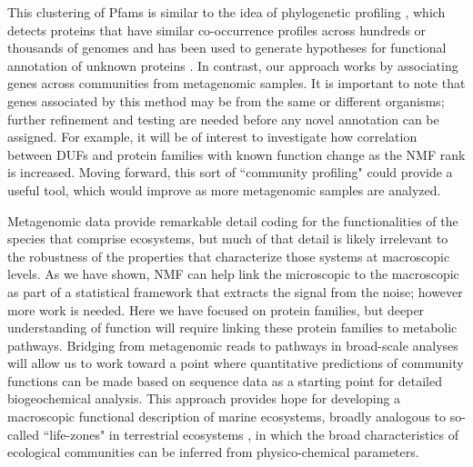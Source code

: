 This clustering of Pfams is similar to the idea of phylogenetic profiling \cite{PellMarc99}, which detects proteins that have similar co-occurrence profiles across hundreds or thousands of genomes and has been used to generate hypotheses for functional annotation of unknown proteins \cite{WuMRen05}. In contrast, our approach works by associating genes across communities from metagenomic samples. It is important to note that genes associated by this method may be from the same or different organisms; further refinement and testing are needed before any novel annotation can be assigned.  For example, it will be of interest to investigate how correlation between DUFs and protein families with known function change as the NMF rank is increased.  Moving forward, this sort of ``community profiling" could provide a useful tool, which would improve as more metagenomic samples are analyzed.


Metagenomic data provide remarkable detail coding for the functionalities of the species that comprise ecosystems, but much of that detail is likely irrelevant to the robustness of the properties that characterize those systems at macroscopic levels.   As we have shown, NMF can help link the microscopic to the macroscopic as part of a statistical framework that extracts the signal from the noise; however more work is needed.  Here we have focused on protein families, but deeper understanding of function will require linking these protein families to metabolic pathways.  Bridging from metagenomic reads to pathways in broad-scale analyses will allow us to work toward a point where quantitative predictions of community functions can be made based on sequence data as a starting point for detailed biogeochemical analysis. This approach provides hope for developing a macroscopic functional description of marine ecosystems, broadly analogous to so-called ``life-zones" in terrestrial ecosystems \cite{Holdridge47,Whittaker62}, in which the broad characteristics of ecological communities can be inferred from physico-chemical parameters.

